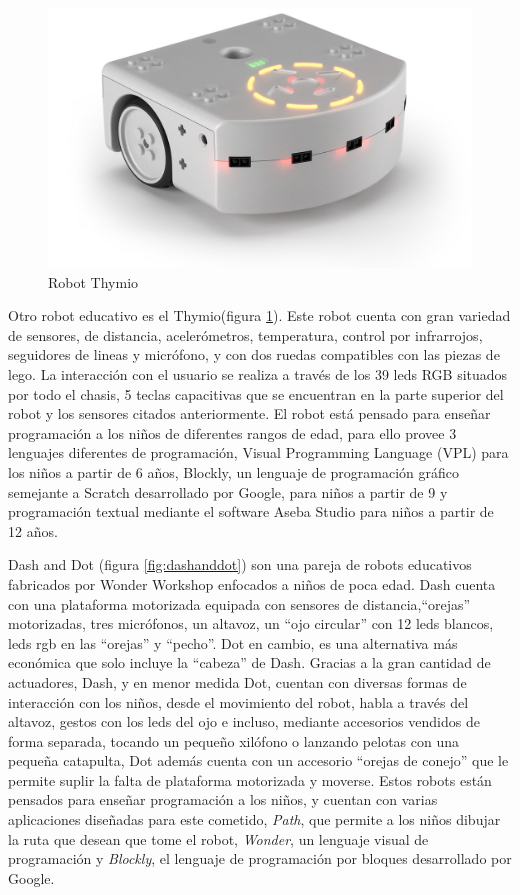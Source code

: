   \begin{figure}
	\centering
	\includegraphics[width=0.6\linewidth]{imagenes/tymio.jpg}
	\caption{Robot Thymio}
	\label{fig:thymio}
\end{figure} 
 Otro robot educativo es el Thymio(figura \ref{fig:thymio}). Este robot cuenta con gran variedad de sensores, de distancia, acelerómetros, temperatura, control por infrarrojos, seguidores de lineas y micrófono, y con dos ruedas compatibles con las piezas de lego. La interacción con el usuario se realiza a través de los 39 leds RGB situados por todo el chasis, 5 teclas capacitivas que se encuentran en la parte superior del robot y los sensores citados anteriormente. El robot está pensado para enseñar programación a los niños de diferentes rangos de edad, para ello provee 3 lenguajes diferentes de programación, Visual Programming Language (VPL) para los niños a partir de 6 años, Blockly, un lenguaje de programación gráfico semejante a Scratch desarrollado por Google, para niños a partir de 9 y programación textual mediante el software Aseba Studio para niños a partir de 12 años.
 
 Dash and Dot (figura \ref{fig:dashanddot}) son una pareja de robots educativos fabricados por Wonder Workshop enfocados a niños de poca edad. Dash cuenta con una plataforma motorizada equipada con sensores de distancia,\enquote{orejas} motorizadas, tres micrófonos, un altavoz, un \enquote{ojo circular} con 12 leds blancos, leds rgb en las \enquote{orejas} y \enquote{pecho}. Dot en cambio, es una alternativa más económica que solo incluye la \enquote{cabeza} de Dash. Gracias a la gran cantidad de actuadores, Dash, y en menor medida Dot, cuentan con diversas formas de interacción con los niños, desde el movimiento del robot, habla a través del altavoz,  gestos con los leds del ojo e incluso, mediante accesorios vendidos de forma separada, tocando un pequeño xilófono o lanzando pelotas con una pequeña catapulta, Dot además cuenta con un accesorio \enquote{orejas de conejo} que le permite suplir la falta de plataforma motorizada y moverse. Estos robots están pensados para enseñar programación a los niños, y cuentan con varias aplicaciones diseñadas para este cometido, \textit{Path}, que permite a los niños dibujar la ruta que desean que tome el robot, \textit{Wonder}, un lenguaje visual de programación y \textit{Blockly}, el lenguaje de programación por bloques desarrollado por Google.
 

